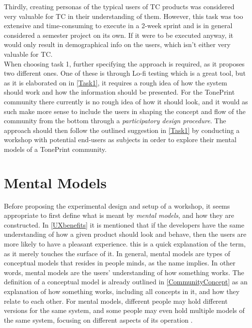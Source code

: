Thirdly, creating personas of the typical users of TC products was considered very valuable for TC in their understanding of them. However, this task was too extensive and time-consuming to execute in a 2-week sprint and is in general considered a semester project on its own. If it were to be executed anyway, it would only result in demographical info on the users, which isn't either very valuable for TC.\\

\noindent
When choosing task 1, further specifying the approach is required, as it proposes two different ones. One of these is through Lo-fi testing which is a great tool, but as it is elaborated on in \autoref{Task1}, it requires a rough idea of how the system should work and how the information should be presented. For the TonePrint community there currently is no rough idea of how it should look, and it would as such make more sense to include the users in shaping the concept and flow of the community from the bottom through a \textit{participatory design procedure}. The approach should then follow the outlined suggestion in \autoref{Task1} by conducting a workshop with potential end-users as subjects in order to explore their mental models of a TonePrint community.

\section{Mental Models}
\label{MentalModel}
Before proposing the experimental design and setup of a workshop, it seems appropriate to first define what is meant by \textit{mental models}, and how they are constructed. In \autoref{UXbenefits} it is mentioned that if the developers have the same understanding of how a given product should look and behave, then the users are more likely to have a pleasant experience. this is a quick explanation of the term, as it merely touches the surface of it. In general, mental models are types of conceptual models that resides in people minds, as the name implies. In other words, mental models are the users' understanding of how something works. The definition of a conceptual model is already outlined in \autoref{CommunityConcept} as an explanation of how something works, including all concepts in it, and how they relate to each other. For mental models, different people may hold different versions for the same system, and some people may even hold multiple models of the same system, focusing on different aspects of its operation \parencite[][26]{PDF:DonNorman}.  


